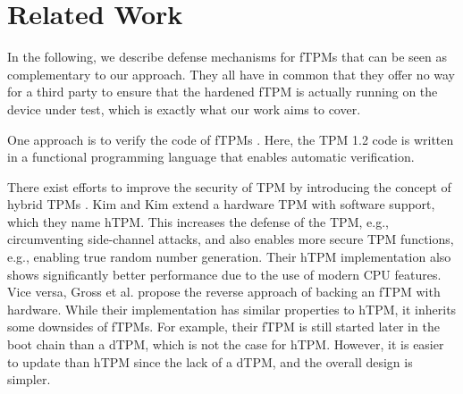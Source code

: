
\chapter{Related Work}\label{chapter:related_work}



In the following, we describe defense mechanisms for fTPMs that can be seen as complementary to our approach. They all have in common that they offer no way for a third party to ensure that the hardened fTPM is actually running on the device under test, which is exactly what our work aims to cover.

One approach is to verify the code of fTPMs \cite{Mukhamedov2013}. Here, the TPM 1.2 code is written in a functional programming language that enables automatic verification.

There exist efforts to improve the security of TPM by introducing the concept of hybrid TPMs \cite{Kim2019, Gross2021}. Kim and Kim \cite{Kim2019} extend a hardware TPM with software support, which they name hTPM. This increases the defense of the TPM, e.g., circumventing side-channel attacks, and also enables more secure TPM functions, e.g., enabling true random number generation. Their hTPM implementation also shows significantly better performance due to the use of modern CPU features.
Vice versa, Gross et al. \cite{Gross2021} propose the reverse approach of backing an fTPM with hardware. While their implementation has similar properties to hTPM, it inherits some downsides of fTPMs. For example, their fTPM is still started later in the boot chain than a dTPM, which is not the case for hTPM. However, it is easier to update than hTPM since the lack of a dTPM, and the overall design is simpler.

